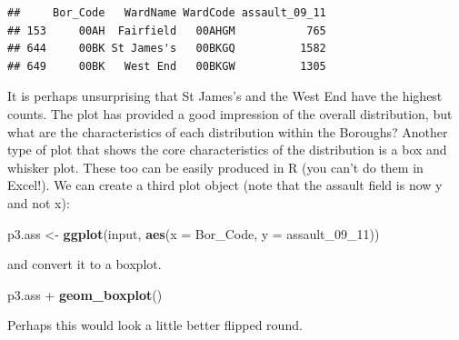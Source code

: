 \documentclass[]{article}
\newenvironment{Shaded}{}{}
\newcommand{\KeywordTok}[1]{\textcolor[rgb]{0.00,0.44,0.13}{\textbf{{#1}}}}
\newcommand{\DataTypeTok}[1]{\textcolor[rgb]{0.56,0.13,0.00}{{#1}}}
\newcommand{\DecValTok}[1]{\textcolor[rgb]{0.25,0.63,0.44}{{#1}}}
\newcommand{\NormalTok}[1]{{#1}}
\begin{document}
\begin{Shaded}
\end{Shaded}
\begin{verbatim}
##     Bor_Code   WardName WardCode assault_09_11
## 153     00AH  Fairfield   00AHGM           765
## 644     00BK St James's   00BKGQ          1582
## 649     00BK   West End   00BKGW          1305
\end{verbatim}
It is perhaps unsurprising that St James's and the West End have the
highest counts. The plot has provided a good impression of the overall
distribution, but what are the characteristics of each distribution
within the Boroughs? Another type of plot that shows the core
characteristics of the distribution is a box and whisker plot. These too
can be easily produced in R (you can't do them in Excel!). We can create
a third plot object (note that the assault field is now y and not x):

\begin{Shaded}
\begin{Highlighting}[]
\NormalTok{p3.ass <- }\KeywordTok{ggplot}\NormalTok{(input, }\KeywordTok{aes}\NormalTok{(}\DataTypeTok{x =} \NormalTok{Bor_Code, }\DataTypeTok{y =} \NormalTok{assault_09_11))}
\end{Highlighting}
\end{Shaded}
and convert it to a boxplot.

\begin{Shaded}
\begin{Highlighting}[]
\NormalTok{p3.ass + }\KeywordTok{geom_boxplot}\NormalTok{()}
\end{Highlighting}
\end{Shaded}
Perhaps this would look a little better flipped round.
\end{document}
